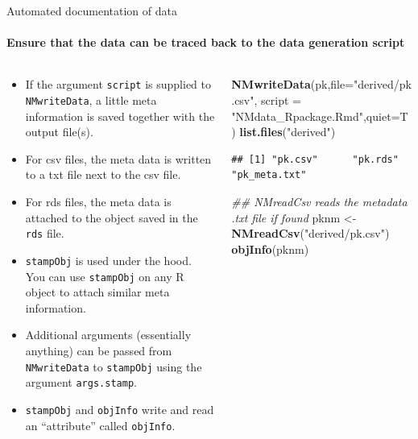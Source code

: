\documentclass[
  8pt,
  ignorenonframetext,
  aspectratio=169]{beamer}
\newenvironment{Shaded}{\begin{snugshade}}{\end{snugshade}}
\newcommand{\CommentTok}[1]{\textcolor[rgb]{0.56,0.35,0.01}{\textit{#1}}}
\newcommand{\DataTypeTok}[1]{\textcolor[rgb]{0.13,0.29,0.53}{#1}}
\newcommand{\KeywordTok}[1]{\textcolor[rgb]{0.13,0.29,0.53}{\textbf{#1}}}
\newcommand{\NormalTok}[1]{#1}
\newcommand{\StringTok}[1]{\textcolor[rgb]{0.31,0.60,0.02}{#1}}
\begin{document}
\begin{frame}[fragile]{Automated documentation of data}
\protect\hypertarget{automated-documentation-of-data}{}
\framesubtitle{Ensure that the data can be traced back to the data generation script}

\begin{columns}[T]
\begin{column}{0.48\textwidth}
\begin{itemize}
\item
  If the argument \texttt{script} is supplied to \texttt{NMwriteData}, a
  little meta information is saved together with the output file(s).
\item
  For csv files, the meta data is written to a txt file next to the csv
  file.
\item
  For rds files, the meta data is attached to the object saved in the
  \texttt{rds} file.
\item
  \texttt{stampObj} is used under the hood. You can use
  \texttt{stampObj} on any R object to attach similar meta information.
\item
  Additional arguments (essentially anything) can be passed from
  \texttt{NMwriteData} to \texttt{stampObj} using the argument
  \texttt{args.stamp}.
\item
  \texttt{stampObj} and \texttt{objInfo} write and read an ``attribute''
  called \texttt{objInfo}.
\end{itemize}
\end{column}

\begin{column}{0.48\textwidth}
\footnotesize

\begin{Shaded}
\begin{Highlighting}[]
\KeywordTok{NMwriteData}\NormalTok{(pk,}\DataTypeTok{file=}\StringTok{"derived/pk.csv"}\NormalTok{,}
            \DataTypeTok{script =} \StringTok{"NMdata\_Rpackage.Rmd"}\NormalTok{,}\DataTypeTok{quiet=}\NormalTok{T)}
\KeywordTok{list.files}\NormalTok{(}\StringTok{"derived"}\NormalTok{)}
\end{Highlighting}
\end{Shaded}

\begin{verbatim}
## [1] "pk.csv"      "pk.rds"      "pk_meta.txt"
\end{verbatim}

\begin{Shaded}
\begin{Highlighting}[]
\CommentTok{\#\# NMreadCsv reads the metadata .txt file if found}
\NormalTok{pknm \textless{}{-}}\StringTok{ }\KeywordTok{NMreadCsv}\NormalTok{(}\StringTok{"derived/pk.csv"}\NormalTok{)}
\KeywordTok{objInfo}\NormalTok{(pknm)}
\end{Highlighting}
\end{Shaded}


\end{column}
\end{columns}
\end{frame}
\end{document}
